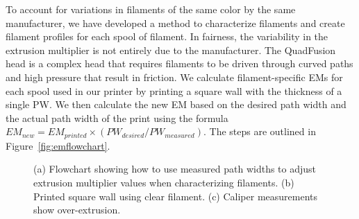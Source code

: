 To account for variations in filaments of the same color by the same manufacturer, we have developed a method to characterize filaments and create filament profiles for each spool of filament. In fairness, the variability in the extrusion multiplier is not entirely due to the manufacturer. The QuadFusion head is a complex head that requires filaments to be driven through curved paths and high pressure that result in friction. We calculate filament-specific \ac{EM}s for each spool used in our printer by printing a square wall with the thickness of a single \ac{PW}. We then calculate the new \ac{EM} based on the desired path width and the actual path width of the print using the formula $EM_{new} = EM_{printed} \times (PW_{desired}/PW_{measured})$. The steps are outlined in Figure~\ref{fig:emflowchart}.

\begin{figure}
	\begin{center}
	\end{center}
	\caption{(a) Flowchart showing how to use measured path widths to adjust extrusion multiplier values when characterizing filaments. (b) Printed square wall using clear filament. (c) Caliper measurements show over-extrusion.} 
	\label{fig:em}
\end{figure} 

